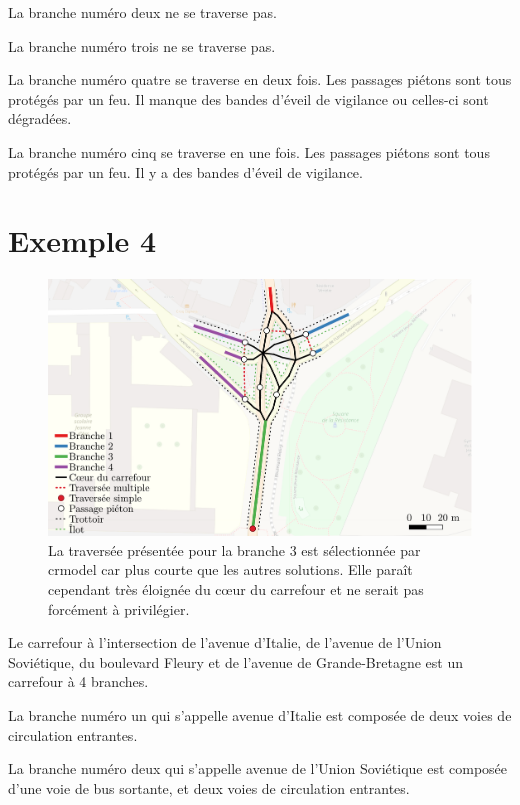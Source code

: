 \begin{appendix}
La branche numéro deux ne se traverse pas.

La branche numéro trois ne se traverse pas.

La branche numéro quatre se traverse en deux fois. Les passages piétons sont tous protégés par un feu. Il manque des bandes d'éveil de vigilance ou celles-ci sont dégradées.

La branche numéro cinq se traverse en une fois. Les passages piétons sont tous protégés par un feu. Il y a des bandes d'éveil de vigilance.

\newpage
\section*{Exemple 4}

\begin{figure}[ht]
    \centering
    \includegraphics[width=\textwidth]{images/annexes/carrefour_gauthier.pdf}
    \caption{La traversée présentée pour la branche 3 est sélectionnée par crmodel car plus courte que les autres solutions. Elle paraît cependant très éloignée du cœur du carrefour et ne serait pas forcément à privilégier.}
    \label{fig:exemple4}
\end{figure}

Le carrefour à l'intersection de l'avenue d'Italie, de l'avenue de l'Union Soviétique, du boulevard Fleury et de l'avenue de Grande-Bretagne est un carrefour à 4 branches.

\newpar{}

La branche numéro un qui s'appelle avenue d'Italie est composée de deux voies de circulation entrantes.

La branche numéro deux qui s'appelle avenue de l'Union Soviétique est composée d'une voie de bus sortante, et deux voies de circulation entrantes.


\end{appendix}
